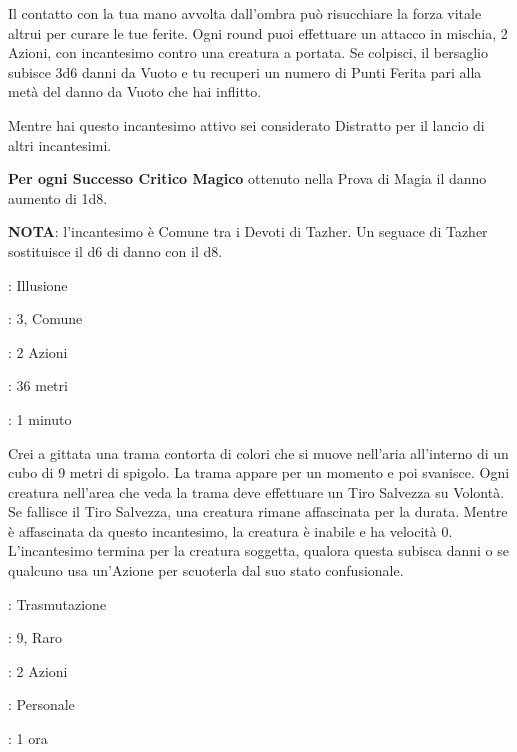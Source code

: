 \begin{multicols}{2}
Il contatto con la tua mano avvolta dall'ombra può risucchiare la forza vitale altrui per curare le tue ferite. Ogni round puoi effettuare un attacco in mischia, 2 Azioni, con incantesimo contro una creatura a portata. Se colpisci, il bersaglio subisce 3d6 danni da Vuoto e tu recuperi un numero di Punti Ferita pari alla metà del danno da Vuoto che hai inflitto.

Mentre hai questo incantesimo attivo sei considerato Distratto per il lancio di altri incantesimi.

\textbf{Per ogni Successo Critico Magico} ottenuto nella Prova di Magia il danno aumento di 1d8.

\textbf{NOTA}: l'incantesimo è Comune tra i Devoti di Tazher. Un seguace di Tazher sostituisce il d6 di danno con il d8.

\noindent\colorbox{OBSSgold!10}{
\begin{minipage}{0.95\linewidth}
\begin{description}[noitemsep, topsep=0pt, parsep=0pt, partopsep=0pt, leftmargin=0cm, labelwidth=1.3cm]
	\item[\textbf{Lista}]: Illusione
	\item[\textbf{Livello}]: 3, Comune
	\item[\textbf{Lancio}]: 2 Azioni
	\item[\textbf{Gittata}]: 36 metri
	\item[\textbf{Durata}]: 1 minuto
\end{description}
\end{minipage}}\smallskip

Crei a gittata una trama contorta di colori che si muove nell'aria all'interno di un cubo di 9 metri di spigolo. La trama appare per un momento e poi svanisce. Ogni creatura nell'area che veda la trama deve effettuare un Tiro Salvezza su Volontà. Se fallisce il Tiro Salvezza, una creatura rimane affascinata per la durata. Mentre è affascinata da questo incantesimo, la creatura è inabile e ha velocità 0. L'incantesimo termina per la creatura soggetta, qualora questa subisca danni o se qualcuno usa un'Azione per scuoterla dal suo stato confusionale.

\noindent\colorbox{OBSSgold!10}{
\begin{minipage}{0.95\linewidth}
\begin{description}[noitemsep, topsep=0pt, parsep=0pt, partopsep=0pt, leftmargin=0cm, labelwidth=1.3cm]
	\item[\textbf{Lista}]: Trasmutazione
	\item[\textbf{Livello}]: 9, Raro
	\item[\textbf{Lancio}]: 2 Azioni
	\item[\textbf{Gittata}]: Personale
	\item[\textbf{Durata}]: 1 ora
\end{description}
\end{minipage}}\smallskip


\end{multicols}
